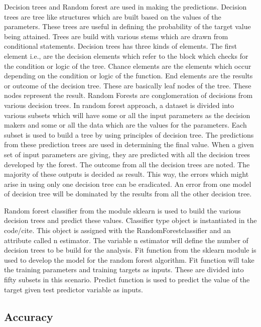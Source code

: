 \documentclass[sigconf]{acmart}
\begin{document}
Decision trees and Random forest are used in making the predictions. Decision trees are tree like structures which are built based on the values of the parameters. These trees are useful in defining the probability of the target value being attained. Trees are build with various stems which are drawn from conditional statements. Decision trees has three kinds of elements. The first element i.e., are the decision elements which refer to the block which checks for the condition or logic of the tree. Chance elements are the elements which occur depending on the condition or logic of the function. End elements are the results or outcome of the decision tree. These are basically leaf nodes of the tree. These nodes represent the result. 
Random Forests are conglomeration of decisions from various decision trees. In random forest approach, a dataset is divided into various subsets which will have some or all the input parameters as the decision makers and some or all the data which are the values for the parameters. Each subset is used to build a tree by using principles of decision tree. The predictions from these prediction trees are used in determining the final value. When a given set of input parameters are giving, they are predicted with all the decision trees developed by the forest. The outcome from all the decision trees are noted. The majority of these outputs is decided as result. This way, the errors which might arise in using only one decision tree can be eradicated. An error from one model of decision tree will be dominated by the results from all the other decision tree. 

Random forest classifier from the module sklearn is used to build the various decision trees and predict these values. Classifier type object is instantiated in the code/cite. This object is assigned with the RandomForestclassifier and an attribute called n estimator. The variable n estimator will define the number of decision trees to be build for the analysis. Fit function from the sklearn module is used to develop the model for the random forest algorithm. Fit function will take the training parameters and training targets as inputs. These are divided into fifty subsets in this scenario. Predict function is used to predict the value of the target given test predictor variable as inputs. 

\subsection{Accuracy}
\end{document}
